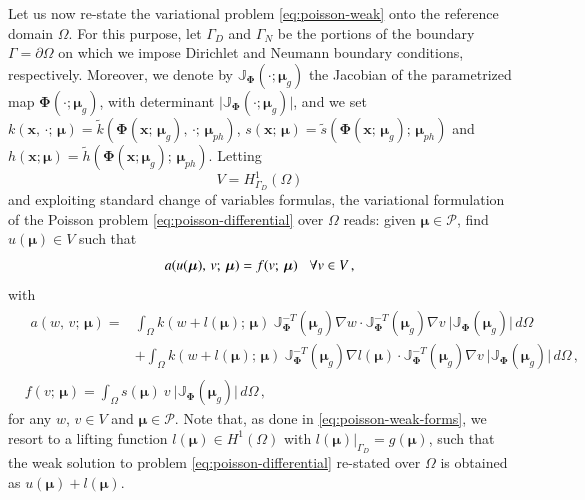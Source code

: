 \documentclass{elsarticle}
\numberwithin{equation}{section}
\theoremstyle{theorem}
\theoremstyle{definition}
\theoremstyle{remark}
\theoremstyle{proposition}
\numberwithin{figure}{section}
\newcommand{\wt}[1]{\widetilde{#1}}
\newcommand{\bg}[1]{\boldsymbol{#1}}
\begin{document}
		Let us now re-state the variational problem \eqref{eq:poisson-weak} onto the reference domain $\Omega$. For this purpose, let $\Gamma_D$ and $\Gamma_N$ be the portions of the boundary $\Gamma = \partial \Omega$ on which we impose Dirichlet and Neumann boundary conditions, respectively. Moreover, we denote by $\mathbb{J}_{\bg{\Phi}}(\cdot; \bg{\mu}_g)$ the Jacobian of the parametrized map $\bg{\Phi}(\cdot; \bg{\mu}_g)$, with determinant $\lvert \mathbb{J}_{\bg{\Phi}}(\cdot; \bg{\mu}_g) \rvert$, and we set $k(\bg{x}, \, \cdot; \, \bg{\mu}) = \wt{k}(\bg{\Phi}(\bg{x}; \, \bg{\mu}_g), \, \cdot; \, \bg{\mu}_{ph})$, $s(\bg{x}; \, \bg{\mu}) = \wt{s}(\bg{\Phi}(\bg{x}; \, \bg{\mu}_g); \, \bg{\mu}_{ph})$ and $h(\bg{x}; \bg{\mu}) = \wt{h}(\bg{\Phi}(\bg{x}; \bg{\mu}_g); \, \bg{\mu}_{ph})$. Letting \[ V = H^1_{\Gamma_D}(\Omega) \] and exploiting standard change of variables formulas, the variational formulation of the Poisson problem \eqref{eq:poisson-differential} over $\Omega$ reads: given $\bg{\mu} \in \mathcal{P}$, find $u(\bg{\mu}) \in V$ such that
		\begin{equation*}
			\label{eq:poisson-weak-reference}
			a(u(\bg{\mu}), \, v; \, \bg{\mu}) = f(v; \, \bg{\mu}) \hspace*{0.3cm} \forall v \in V \, ,
		\end{equation*}
		with
		\begin{equation*}
			\label{eq:poisson-weak-forms-reference}
			\begin{aligned}
				&
				\begin{aligned}
				a(w, \, v; \, \bg{\mu}) = & \int_{\Omega} k(w + l(\bg{\mu}); \, \bg{\mu}) ~ \mathbb{J}^{-T}_{\bg{\Phi}}(\bg{\mu}_g) \nabla w \cdot \mathbb{J}^{-T}_{\bg{\Phi}}(\bg{\mu}_g) \nabla v ~ \lvert \mathbb{J}_{\bg{\Phi}}(\bg{\mu}_g) \rvert \, d \Omega \\
				& + \int_{\Omega} k(w + l(\bg{\mu}); \, \bg{\mu}) ~ \mathbb{J}^{-T}_{\bg{\Phi}}(\bg{\mu}_g) \nabla l(\bg{\mu}) \cdot \mathbb{J}^{-T}_{\bg{\Phi}}(\bg{\mu}_g) \nabla v ~ \lvert \mathbb{J}_{\bg{\Phi}}(\bg{\mu}_g) \rvert \, d \Omega \, ,
				\end{aligned} \\
				& f(v; \, \bg{\mu}) = \int_{\Omega} s(\bg{\mu}) ~ v ~ \lvert \mathbb{J}_{\bg{\Phi}}(\bg{\mu}_g) \rvert \, d \Omega \, ,  
			\end{aligned}
		\end{equation*}
		for any $w$, $v \in V$ and $\bg{\mu} \in \mathcal{P}$. Note that, as done in \eqref{eq:poisson-weak-forms}, we resort to a lifting function $l(\bg{\mu}) \in H^1(\Omega)$ with $l(\bg{\mu}) \big\rvert_{\Gamma_D} = g(\bg{\mu})$, such that the weak solution to problem \eqref{eq:poisson-differential} re-stated over $\Omega$ is obtained as $u(\bg{\mu}) + l(\bg{\mu})$.
		
\end{document}
